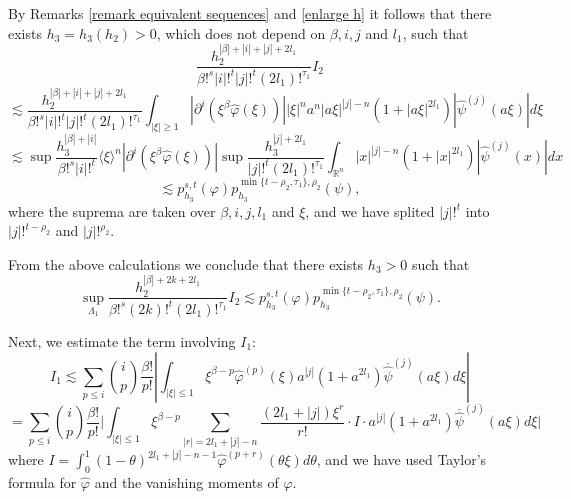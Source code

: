 \documentclass[reqno,12pt]{amsart}
\theoremstyle{plain}
\theoremstyle{definition}
\theoremstyle{remark}
\begin{document}
By Remarks \ref{remark equivalent sequences} and \ref{enlarge h} it
follows that there exists $ h_3 = h_3(h_2) > 0$, which does not
depend on $\beta, i,j$ and $l_1$,  such that
$$
\frac{h_2 ^{|\beta| + |i|+|j| + 2l_1} }{ \beta!^s |i|!^{t} |j|!^{t}
(2l_1) !^{\tau_1}} I_2
$$
$$
\lesssim \frac{h_2 ^{|\beta| + |i|+|j| + 2l_1} }{ \beta!^s |i|!^{t}
|j|!^{t} (2l_1) !^{\tau_1}}
 \int_{|\xi| \geq 1}   | \partial ^i
(\xi^{\beta} \hat{\varphi} (\xi))| |\xi|^{n} a^{n}  |a\xi|^{|j|-n}(1+|a\xi|^{2l_1}) |
\hat{\psi} ^{(j)} (a\xi)| d\xi
$$
$$
\lesssim \sup_{} \frac{h_3 ^{|\beta| + |i|} }{ \beta!^s |i|!^{t} }\langle \xi \rangle ^{n} |
\partial ^i (\xi^{\beta} \hat{\varphi} (\xi))   |\sup_{} \frac{h_3
^{|j| + 2l_1} }{  |j|!^{t} (2l_1) !^{\tau_1}} \int_{\mathbb{R}^{n}}
|x|^{|j|-n} (1+|x|^{2l_1})| \hat{\psi} ^{(j)} (x)| dx
$$
$$
\lesssim p_{h_3 } ^{s, t} (\varphi) p^{\min\{t  - \rho_2,
\tau_1\},  \rho_2} _{h_3} (\psi),
$$
where the suprema are taken over $\beta, i,j, l_1 $ and $ \xi $, and
we have splited $|j|!^t$ into $|j|!^{t -\rho_2} $ and  $|j|!^{\rho_2} $.

\par

From the above calculations we conclude that there exists $ h_3> 0$
such that
$$
\sup_{\Lambda_1} \frac{h_2 ^{|\beta| +2k+ 2l_1} }{ \beta!^s
(2k)!^{t} (2l_1) !^{\tau_1}}  I_2 \lesssim p_{h_3 } ^{s, t}
(\varphi) p^{\min\{t  - \rho_2, \tau_1\},  \rho_2} _{h_3}
(\psi).
$$

\par

Next, we estimate the term involving $I_1$:
$$
I_1 \lesssim \sum_{p\leq i} {i \choose p} \frac{\beta!}{p!} \left |
\int_{|\xi| \leq 1} \xi^{\beta - p} \hat \varphi ^{(p)} (\xi)
a^{|j|}(1+a^{2l_1}) \overline{\hat{\psi}} ^{(j)} (a\xi) d\xi \right |
$$
$$
= \sum_{p\leq i} {i \choose p} \frac{\beta!}{p!} \Big | \int_{|\xi|
\leq 1} \xi^{\beta - p} \sum_{|r|= 2l_1 + |j|-n} \frac{(2l_1 + |j|)
\xi^{r}}{r!} \cdot I \cdot a^{|j|} (1+a^{2l_1})
\overline{\hat{\psi}}^{(j)}  (a\xi) d\xi \Big |
$$
where $ I = \int_0 ^1 (1-\theta)^{2l_1 + |j|-n-1} \hat \varphi ^{(p +
r)} (\theta \xi) d\theta$, and we have used Taylor's formula for $ \hat
\varphi $ and the vanishing moments of $ \varphi$.

\par
\end{document}
